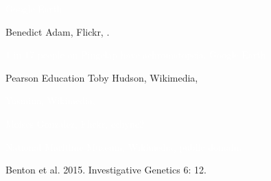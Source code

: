\documentclass[t]{beamer}
\newcommand{\blurred}[3]{
\draw [black!#1] node at (#2,#2) {#3};
\draw [black!#1] node at (0,#2) {#3};
\draw [black!#1] node at (#2,0) {#3};
\draw [black!#1] node at (-#2,#2) {#3};
\draw [black!#1] node at (-#2,0) {#3};
\draw [black!#1] node at (0,-#2) {#3};
\draw [black!#1] node at (#2,-#2) {#3};
\draw [black!#1] node at (-#2,-#2) {#3};
}
\newcommand{\blurry}[1]{
\blurred{5}{0.04}{#1}
\blurred{13}{0.017}{#1}
\blurred{10}{0.012}{#1}
\blurred{15}{0.007}{#1}
\blurred{20}{0.003}{#1}
\blurred{10}{0.0015}{#1}
\draw [black!40] node at (0,0) {#1};
}
\begin{document}
{
\begin{frame}[b]{}
\end{frame}
}
%
{
\begin{frame}[b]{}
\hfill \tiny \textcolor{white}{Google Earth}
\end{frame}
}
%
{
\begin{frame}[b]{}
\tiny Benedict Adam, Flickr, .
\end{frame}
}
%
{
\begin{frame}[b]{}
\end{frame}
}
%

{
\begin{frame}[b]{\textcolor{white}{1 in 17 people on Pingelap have achromatopsia.}}
\hfill \tiny \textcolor{white}{Google Earth}
\end{frame}
}
%
{
\begin{frame}[b,plain]{}
\tiny \textcopyright Pearson Education \hfill Toby Hudson, Wikimedia, 
\end{frame}
}
%

{
\begin{frame}[b]{}
\hfill \textcolor{white}{\tiny Yasmina, Wikimedia, }
\end{frame}
}
%
{
\begin{frame}[b]{}
\hfill \textcolor{white}{\tiny Moises Gonzalez, Flickr, ccbync{2}}
\end{frame}
}
%
{
\begin{frame}[b]{}
\hfill \textcolor{white}{\tiny National Maritime Museum, Wikimedia, public domain.}
\end{frame}
}
%
{
\begin{frame}[b]{}
\tiny Benton et al. 2015. Investigative Genetics 6: 12.
\end{frame}
}
%
\end{document}
